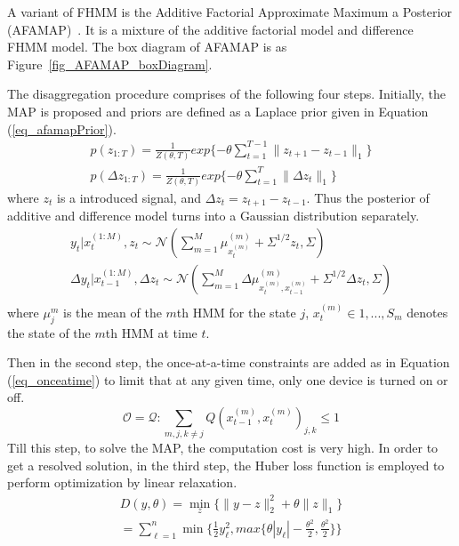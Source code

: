 A variant of FHMM is the Additive Factorial Approximate Maximum a Posterior (AFAMAP)~\cite{kolter2012aistat}.
It is a mixture of the additive factorial model and
difference FHMM model.
The box diagram of AFAMAP is as Figure~\ref{fig_AFAMAP_boxDiagram}.

The disaggregation procedure comprises of the following four steps. 
Initially, the MAP is proposed and
priors are defined as a Laplace prior given in Equation (\ref{eq_afamapPrior}).
\begin{equation}
\label{eq_afamapPrior}
\begin{aligned}
p(z_{1:T})= \frac{1}{Z(\theta,T)}exp\{-\theta \sum_{t=1}^{T-1} \lVert z_{t+1}-z_{t-1}\rVert_1\} \\
p(\Delta z_{1:T})=\frac{1}{Z(\theta,T)}exp\{-\theta \sum_{t=1}^{T}\lVert \Delta z_t \rVert_1\}
\end{aligned}
\end{equation}
where $z_t$ is a introduced signal, and $\Delta z_t = z_{t+1}-z_{t-1}$.
Thus the posterior of additive and difference model turns into a Gaussian distribution 
separately. 
\begin{equation}
\begin{aligned}
y_t|x_t^{(1:M)},z_t\sim \mathcal{N}(\sum_{m=1}^{M}\mu_{x_t^{(m)}}^{(m)}+\Sigma^{1/2}{z_t},\Sigma)\\
\Delta y_t|x_{t-1}^{(1:M)},\Delta z_t\sim \mathcal{N}(\sum_{m=1}^{M}\Delta \mu^{(m)}_{x_t^{(m)},x_{t-1}^{(m)}}+\Sigma^{1/2}\Delta z_t,\Sigma)\\
\end{aligned}
\end{equation}
where $\mu_j^m$ is the mean of the $m$th HMM for the state $j$, 
$x_t^{(m)} \in {1,...,S_m}$ denotes the state of the $m$th HMM at time $t$. 

Then in the second step, the once-at-a-time constraints are added as in Equation (\ref{eq_onceatime}) to limit that at any given time, 
only one device is turned on or off. 
\begin{equation}
\label{eq_onceatime}
\mathcal{O} = {\mathcal{Q}: \sum_{m,j,k \neq j} Q(x_{t-1}^{(m)},x_t^{(m)})_{j,k}\leq 1}
\end{equation}
Till this step, to solve the MAP, the computation cost is very high. 
In order to get a resolved solution, in the third step, the Huber loss function is employed to perform optimization by linear relaxation. 
\begin{equation}
\begin{aligned}
D(y,\theta)= \min_{z}\{\lVert y-z \rVert_2^2+ \theta \lVert z \rVert_1\} \\
= \sum_{\ell=1}^{n}\min\{\frac{1}{2}y_{\ell}^2,max\{\theta|y_{\ell}|-\frac{\theta^2}{2}, \frac{\theta^2}{2}\}\}
\end{aligned}
\end{equation}

